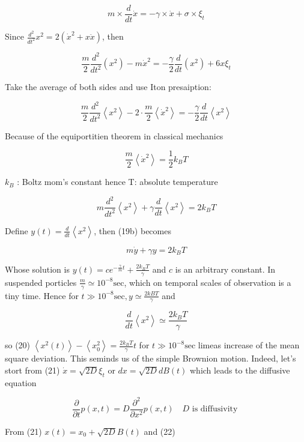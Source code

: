$$ m \times \frac{d}{d t} \dot{x}=-\gamma \times \dot{x}+\sigma \times \xi_{t} $$

Since $\frac{d^{2}}{d t^{2}} x^{2}=2\left(\dot{x}^{2}+x \ddot{x}\right)$, then

$$ \frac{m}{2} \frac{d^{2}}{d t^{2}}\left(x^{2}\right)-m \dot{x}^{2}=-\frac{\gamma}{2} \frac{d}{d t}\left(x^{2}\right)+6 x \xi_{t} $$

Take the average of both sides and use Iton presaiption:

$$ \frac{m}{2} \frac{d^{2}}{d t^{2}}\left\langle x^{2}\right\rangle-2 \cdot \frac{m}{2}\left\langle\dot{x}^{2}\right\rangle=-\frac{\gamma}{2} \frac{d}{d t}\left\langle x^{2}\right\rangle $$

Because of the equiportitien theorem in classical mechanics

$$ \frac{m}{2}\left\langle\dot{x}^{2}\right\rangle=\frac{1}{2} k_{B} T $$

$k_{B}$ : Boltz mom's constant
hence T: absolute temperature


\begin{equation*}
m \frac{d^{2}}{d t^{2}}\left\langle x^{2}\right\rangle+\gamma \frac{d}{d t}\left\langle x^{2}\right\rangle=2 k_{B} T \tag{196}
\end{equation*}


Define $y(t)=\frac{d}{d t}\left\langle x^{2}\right\rangle$, then (19b) becomes

$$ m \dot{y}+\gamma y=2 k_{B} T $$

Whose solution is $y(t)=c e^{-\frac{\gamma}{m} t}+\frac{2 k_{B} T}{\gamma}$ and $c$ is an arbitrary constant.
In suspended porticles $\frac{m}{\gamma} \simeq 10^{-8} \mathrm{sec}$, which on temporal scales of observation is a tiny time. Hence for $t \gg 10^{-8} \mathrm{sec}, y \simeq \frac{2 k B T}{\gamma}$ and

$$ \frac{d}{d t}\left\langle x^{2}\right\rangle \simeq \frac{2 k_{B} T}{\gamma} $$

so (20) $\left\langle x^{2}(t)\right\rangle-\left\langle x_{0}^{2}\right\rangle=\frac{2 k_{B} T}{\gamma} t$ for $t \gg 10^{-8} \mathrm{sec}$
limeas increase of the mean square deviation.
This seminds us of the simple Brownion motion. Indeed, let's stort from
(21) $\dot{x}=\sqrt{2 D} \xi_{t}$ or $d x=\sqrt{2 D} d B(t)$
which leads to the diffusive equation

$$ \frac{\partial}{\partial t} p(x, t)=D \frac{\partial^{2}}{\partial x^{2}} p(x, t) \quad D \text { is diffusivity } $$

From (21) $x(t)=x_{0}+\sqrt{2 D} B(t)$ and
(22)

